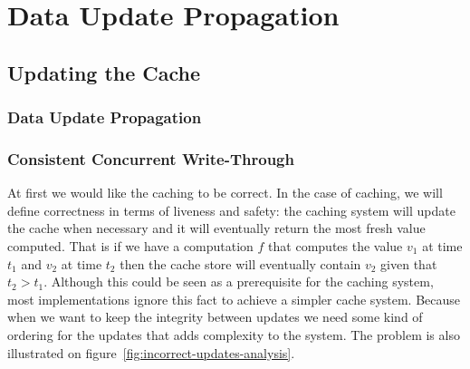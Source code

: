 \chapter{Data Update Propagation}
\label{chapter:data-update-propagation}


\section{Updating the Cache}
\label{sec:updating_the_cache}


\subsection{Data Update Propagation}
\label{subsec:data_update_propagation}



\subsection{Consistent Concurrent Write-Through}
\label{subsec:consistent_concurrent_write_through}


At first we would like the caching to be correct. In the case of caching, we will define correctness in terms of liveness and safety: the caching system will update the cache when necessary and it will eventually return the most fresh value computed. That is if we have a computation $f$ that computes the value $v_1$ at time $t_1$ and $v_2$ at time $t_2$ then the cache store will eventually contain $v_2$ given that $t_2 > t_1$. Although this could be seen as a prerequisite for the caching system, most implementations ignore this fact to achieve a simpler cache system. Because when we want to keep the integrity between updates we need some kind of ordering for the updates that adds complexity to the system. The problem is also illustrated on figure~\ref{fig:incorrect-updates-analysis}.

